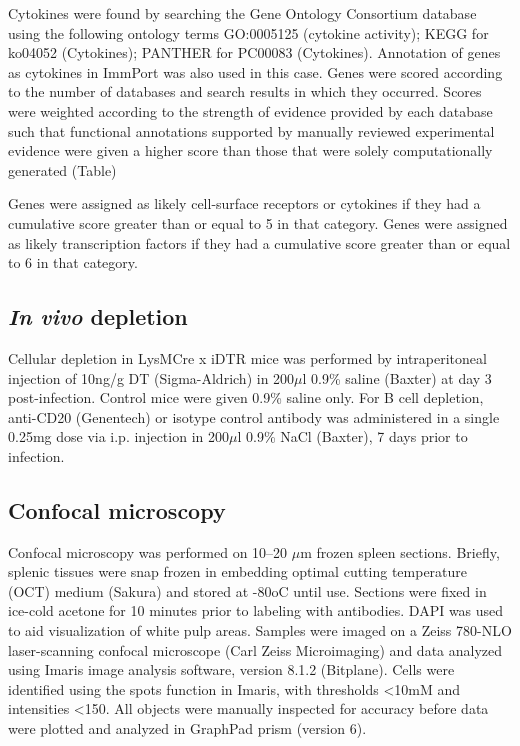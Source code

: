 Cytokines were found by searching the Gene Ontology Consortium database using the following ontology terms GO:0005125 (cytokine activity); KEGG for ko04052 (Cytokines); PANTHER for PC00083 (Cytokines). Annotation of genes as cytokines in ImmPort was also used in this case. Genes were scored according to the number of databases and search results in which they occurred. Scores were weighted according to the strength of evidence provided by each database such that functional annotations supported by manually reviewed experimental evidence were given a higher score than those that were solely computationally generated (Table)

Genes were assigned as likely cell-surface receptors or cytokines if they had a cumulative score greater than or equal to 5 in that category. Genes were assigned as likely transcription factors if they had a cumulative score greater than or equal to 6 in that category.

\subsection{\textit{In vivo} depletion}

Cellular depletion in LysMCre x iDTR mice was performed by intraperitoneal injection of 10ng/g DT (Sigma-Aldrich) in 200\( \mu \)l 0.9\% saline (Baxter) at day 3 post-infection. Control mice were given 0.9\% saline only. For B cell depletion, anti-CD20 (Genentech) or isotype control antibody was administered in a single 0.25mg dose via i.p. injection in 200\( \mu \)l 0.9\% NaCl (Baxter), 7 days prior to infection.

\subsection{Confocal microscopy}

Confocal microscopy was performed on 10–20 \( \mu \)m frozen spleen sections. Briefly, splenic tissues were snap frozen in embedding optimal cutting temperature (OCT) medium (Sakura) and stored at -80oC until use. Sections were fixed in ice-cold acetone for 10 minutes prior to labeling with antibodies. DAPI was used to aid visualization of white pulp areas. Samples were imaged on a Zeiss 780-NLO laser-scanning confocal microscope (Carl Zeiss Microimaging) and data analyzed using Imaris image analysis software, version 8.1.2 (Bitplane). Cells were identified using the spots function in Imaris, with thresholds <10mM and intensities <150. All objects were manually inspected for accuracy before data were plotted and analyzed in GraphPad prism (version 6).

